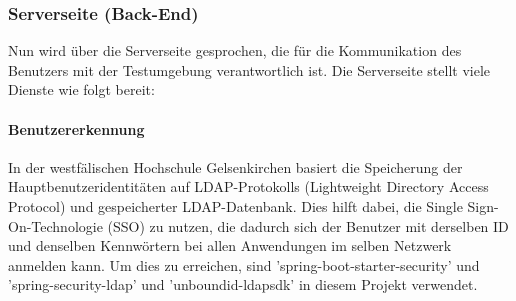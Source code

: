\documentclass[a4paper,12pt,oneside]{book}
\begin{document}
\subsubsection{Serverseite (Back-End)}
Nun wird über die Serverseite gesprochen, die für die Kommunikation des Benutzers mit der Testumgebung verantwortlich ist.
\newline
Die Serverseite stellt viele Dienste wie folgt bereit:
\paragraph{Benutzererkennung} In der westfälischen Hochschule Gelsenkirchen basiert die Speicherung der Hauptbenutzeridentitäten auf LDAP-Protokolls (Lightweight Directory Access Protocol) und gespeicherter LDAP-Datenbank. Dies hilft dabei, die Single Sign-On-Technologie (SSO) zu nutzen, die dadurch sich der Benutzer mit derselben ID und denselben Kennwörtern bei allen Anwendungen im selben Netzwerk anmelden kann. Um dies zu erreichen, sind 'spring-boot-starter-security' und 'spring-security-ldap' und 'unboundid-ldapsdk' in diesem Projekt verwendet.
\end{document}
